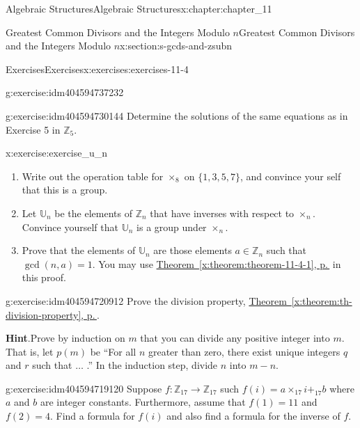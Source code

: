 \documentclass[twoside,10pt,]{book}
\newcommand{\blocktitlefont}{\relax}
\newcommand{\xreffont}{\relax}
\numberwithin{equation}{section}
\begin{document}
\begin{chapterptx}{Algebraic Structures}{}{Algebraic Structures}{}{}{x:chapter:chapter_11}
\begin{sectionptx}{Greatest Common Divisors  and the Integers Modulo \(n\)}{}{Greatest Common Divisors  and the Integers Modulo \(n\)}{}{}{x:section:s-gcds-and-zsubn}
\begin{exercises-subsection}{Exercises}{}{Exercises}{}{}{x:exercises:exercises-11-4}
\begin{divisionexercise}{7}{}{}{g:exercise:idm404594737232}
%
\end{divisionexercise}%
\begin{divisionexercise}{8}{}{}{g:exercise:idm404594730144}%
Determine the solutions of the same equations as in Exercise 5 in \(\mathbb{Z}_5\).%
\end{divisionexercise}%
\begin{divisionexercise}{9}{}{}{x:exercise:exercise_u_n}%
%
\begin{enumerate}[label=(\alph*)]
\item{}Write out the operation table for \(\times_8\) on \(\{1,3,5,7\}\), and convince your self that this is a group.%
\item{}Let \(\mathbb{U}_{n}\) be the elements of \(\mathbb{Z}_{n}\) that have inverses with respect to \(\times_{n}\).  Convince yourself that \(\mathbb{U}_{n}\) is a group under \(\times_{n}\).%
\item{}Prove that the elements of \(\mathbb{U}_{n}\)  are those elements  \(a\in \mathbb{Z}_{n} \) such that \(\gcd(n,a)=1\).  You may use  \hyperref[x:theorem:theorem-11-4-1]{Theorem~{\xreffont\ref{x:theorem:theorem-11-4-1}}, p.\,\pageref{x:theorem:theorem-11-4-1}} in this proof.%
\end{enumerate}
%
\end{divisionexercise}%
\begin{divisionexercise}{10}{}{}{g:exercise:idm404594720912}%
Prove the division property, \hyperref[x:theorem:th-division-property]{Theorem~{\xreffont\ref{x:theorem:th-division-property}}, p.\,\pageref{x:theorem:th-division-property}}.%
\par\smallskip%
\noindent\textbf{\blocktitlefont Hint}.\label{g:hint:idm404594719472}{}\hypertarget{g:hint:idm404594719472}{}\quad{}Prove by induction on \(m\) that you can divide any positive integer into \(m\). That is, let \(p(m)\) be ``For all \(n\) greater than zero, there exist unique integers \(q\) and \(r\) such that \(\dots\) .''  In the induction step, divide \(n\) into \(m - n\).%
\end{divisionexercise}%
\begin{divisionexercise}{11}{}{}{g:exercise:idm404594719120}%
Suppose \(f:\mathbb{Z}_{17}\to \mathbb{Z}_{17}\) such \(f(i)=a \times_{17} i +_{17} b \) where \(a\) and \(b\) are integer constants. Furthermore,  assume that \(f(1)=11\) and \(f(2)=4\). Find a formula for \(f(i)\) and also find a formula for the inverse of \(f\).%
\end{divisionexercise}%
\end{exercises-subsection}

\end{sectionptx}
\end{chapterptx}
\end{document}
